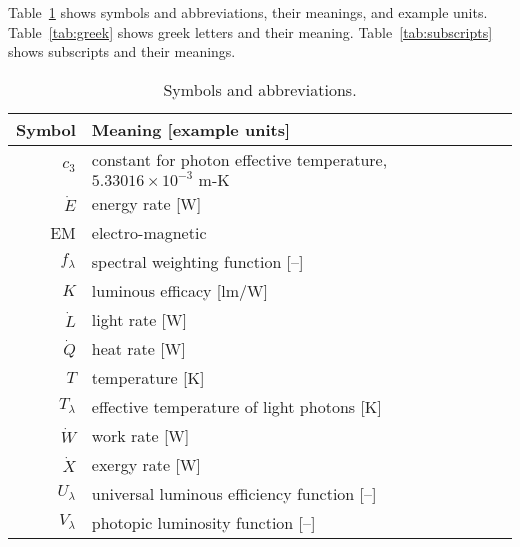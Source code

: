 
\noindent 
Table~\ref{tab:symbols} shows symbols and abbreviations, their meanings, and example units.
Table~\ref{tab:greek} shows greek letters and their meaning.
Table~\ref{tab:subscripts} shows subscripts and their meanings.


  
\begin{table}
\centering %
\caption{Symbols and abbreviations.}
\begin{tabular}{r l}
\toprule
Symbol & Meaning [example units] \\
\midrule
$c_3$ & constant for photon effective temperature, $5.33016 \times 10^{-3} \text{ m-K}$ \\
$\dot{E}$ & energy rate [W] \\
EM & electro-magnetic \\
$f_\lambda$ & spectral weighting function [--] \\
$K$ & luminous efficacy [lm/W] \\
$\dot{L}$ & light rate [W] \\
$\dot{Q}$ & heat rate [W] \\
$T$ & temperature [K] \\
$T_\lambda$ & effective temperature of light photons [K] \\
$\dot{W}$ & work rate [W] \\
$\dot{X}$ & exergy rate [W] \\
$U_\lambda$ & universal luminous efficiency function [--] \\
$V_\lambda$ & photopic luminosity function [--] \\
\bottomrule
\end{tabular}
\label{tab:symbols}
\end{table}



